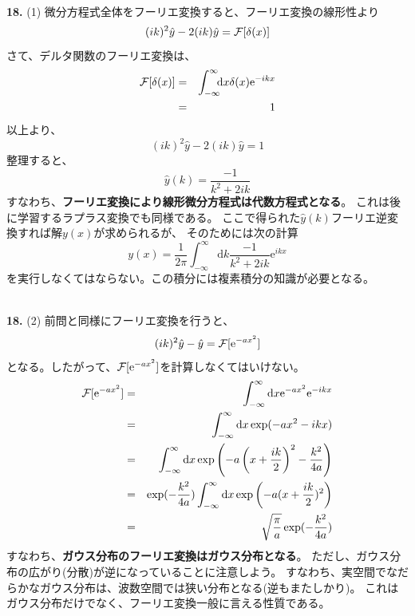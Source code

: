 \documentclass{jarticle}
\newcommand{\diff}{\mathrm d}
\newcommand{\ans}[2]{\noindent\\ {\bf \large #1.} (#2)}
\newcommand{\e}{\mathrm e}
\begin{document}
\ans{18}{1}
微分方程式全体をフーリエ変換すると、フーリエ変換の線形性より
\begin{equation}
  (ik)^2 \hat{y} - 2 (ik) \hat{y} = {\cal F}[\delta(x)]
\end{equation}
さて、デルタ関数のフーリエ変換は、
\begin{eqnarray}
  {\cal F}[\delta(x)] &=& \int_{-\infty}^{\infty} \!\!\! \diff x \delta(x) \e^{-ikx}\\
  &=& 1
\end{eqnarray}
以上より、
\begin{equation}
  (ik)^2 \hat{y} - 2 (ik) \hat{y} = 1
\end{equation}
整理すると、
\begin{equation}
  \hat{y}(k) = \frac{-1}{k^2+2ik}
\end{equation}
すなわち、{\bf フーリエ変換により線形微分方程式は代数方程式となる}。
これは後に学習するラプラス変換でも同様である。
ここで得られた$\hat{y}(k)$フーリエ逆変換すれば解$y(x)$が求められるが、
そのためには次の計算
\begin{equation}
  y(x) = \frac{1}{2 \pi} \int_{-\infty}^{\infty}\diff k \frac{-1}{k^2+2ik} \e^{ikx}
\end{equation}
を実行しなくてはならない。この積分には複素積分の知識が必要となる。

\ans{18}{2}
前問と同様にフーリエ変換を行うと、
\begin{equation}
  (ik)^2 \hat{y} - \hat{y} = {\cal F}[\e^{-ax^2}]
\end{equation}
となる。したがって、${\cal F}[\e^{-ax^2}]$を計算しなくてはいけない。
\begin{eqnarray}
  {\cal F}[\e^{-ax^2}] &=& \int_{-\infty}^{\infty}\diff x \e^{-ax^2} \e^{-ikx}\\
  &=& \int_{-\infty}^{\infty}\diff x \exp({-ax^2-ikx})\\
  &=& \int_{-\infty}^{\infty}\diff x \exp\left( -a \left(x+\frac{ik}{2}\right)^2 - \frac{k^2}{4a} \right)\\
  &=& \exp(-{\frac{k^2}{4a}})  \int_{-\infty}^{\infty}\diff x \exp\left( -a (x+\frac{ik}{2})^2 \right)\\
  &=& \sqrt{\frac{\pi}{a}} \exp(-{\frac{k^2}{4a}})
\end{eqnarray}
すなわち、{\bf ガウス分布のフーリエ変換はガウス分布となる}。
ただし、ガウス分布の広がり(分散)が逆になっていることに注意しよう。
すなわち、実空間でなだらかなガウス分布は、波数空間では狭い分布となる(逆もまたしかり)。
これはガウス分布だけでなく、フーリエ変換一般に言える性質である。
\end{document}
